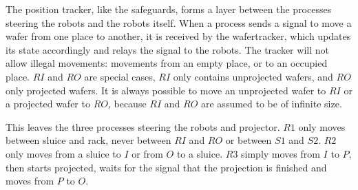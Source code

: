 The position tracker, like the safeguards, forms a layer between the processes steering the robots and the robots itself. When a process sends a signal to move a wafer from one place to another, it is received by the wafertracker, which updates its state accordingly and relays the signal to the robots. The tracker will not allow illegal movements: movements from an empty place, or to an occupied place. $RI$ and $RO$ are special cases, $RI$ only contains unprojected wafers, and $RO$ only projected wafers. It is always possible to move an unprojected wafer to $RI$ or a projected wafer to $RO$, because $RI$ and $RO$ are assumed to be of infinite size.

This leaves the three processes steering the robots and projector. $R1$ only moves between sluice and rack, never between $RI$ and $RO$ or between $S1$ and $S2$. $R2$ only moves from a sluice to $I$ or from $O$ to a sluice. $R3$ simply moves from $I$ to $P$, then starts projected, waits for the signal that the projection is finished and moves from $P$ to $O$.